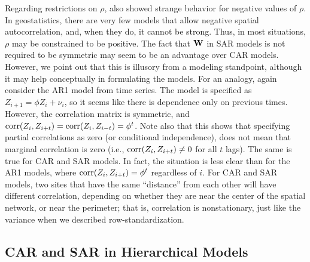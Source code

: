 \documentclass[11pt, titlepage]{article}\usepackage[]{graphicx}\usepackage[]{color}
\begin{document}
\begin{spacing}{1.9}
\begin{flushleft}
Regarding restrictions on $\rho$, \citet{Wall:clos:2004} also showed strange behavior for negative values of $\rho$. In geostatistics, there are very few models that allow negative spatial autocorrelation, and, when they do, it cannot be strong. Thus, in most situations, $\rho$ may be constrained to be positive. The fact that $\mathbf{W}$ in SAR models is not required to be symmetric may seem to be an advantage over CAR models.  However, we point out that this is illusory from a modeling standpoint, although it may help conceptually in formulating the models.  For an analogy, again consider the AR1 model from time series.  The model is specified as $Z_{i+1} = \phi Z_i + \nu_i$, so it seems like there is dependence only on previous times.  However, the correlation matrix is symmetric, and $\textrm{corr}(Z_i, Z_{i + t}) = \textrm{corr}(Z_i,Z_{i - t}) = \phi^t$.  Note also that this shows that specifying partial correlations as zero (or conditional independence), does not mean that marginal correlation is zero (i.e., $\textrm{corr}(Z_i, Z_{i + t}) \neq 0$ for all $t$ lags).  The same is true for CAR and SAR models.  In fact, the situation is less clear than for the AR1 models, where $\textrm{corr}(Z_i, Z_{i + t}) = \phi^t$ regardless of $i$.  For CAR and SAR models, two sites that have the same ``distance'' from each other will have different correlation, depending on whether they are near the center of the spatial network, or near the perimeter; that is, correlation is nonstationary, just like the variance when we described row-standardization.

\subsection*{CAR and SAR in Hierarchical Models}


\end{flushleft}
\end{spacing}
\end{document}
